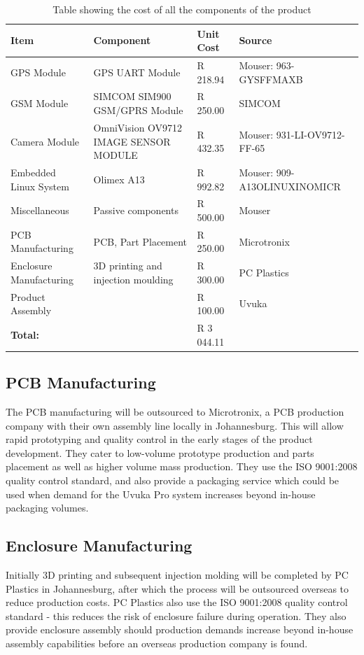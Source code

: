 \begin{table}[htbp]
  \centering
  \caption{Table showing the cost of all the components of the product}
    \begin{tabular}{k{0.2\textwidth}k{0.15\textwidth}R{0.15\textwidth}k{0.3\textwidth}}
    \toprule
    \textbf{Item} & \textbf{Component} & \textbf{Unit Cost} & \textbf{Source} \\
    \midrule
	GPS Module & GPS UART Module & R 218.94 & Mouser: 963-GYSFFMAXB \\ \midrule
    GSM Module & SIMCOM SIM900 GSM/GPRS Module & R 250.00 & SIMCOM \\ \midrule
    Camera Module & OmniVision OV9712 IMAGE SENSOR MODULE & R 432.35 & Mouser: 931-LI-OV9712-FF-65  \\ \midrule
    Embedded Linux System & Olimex A13 & R 992.82 & Mouser: 909-A13OLINUXINOMICR \\ \midrule
    Miscellaneous  & Passive components & R 500.00 & Mouser \\ \midrule
    PCB Manufacturing & PCB, Part Placement & R 250.00 & Microtronix \\ \midrule
    Enclosure Manufacturing & 3D printing and injection moulding & R 300.00 & PC Plastics \\ \midrule
    Product Assembly &       & R 100.00 & Uvuka \\ \midrule

    \textbf{Total:} &       & R 3 044.11 &  \\
    \bottomrule
    \end{tabular}%
  \label{tab:productCost}%
\end{table}%

\newpage
\subsection{PCB Manufacturing}
The PCB manufacturing will be outsourced to Microtronix, a PCB production company with their own assembly line locally in Johannesburg. This will allow rapid prototyping and quality control in the early stages of the product development. They cater to low-volume prototype production and parts placement as well as higher volume mass production. They use the ISO 9001:2008 quality control standard, and also provide a packaging service which could be used when demand for the Uvuka Pro system increases beyond in-house packaging volumes.

\subsection{Enclosure Manufacturing}
Initially 3D printing and subsequent injection molding will be completed by PC Plastics in Johannesburg, after which the process will be outsourced overseas to reduce production costs. PC Plastics also use the ISO 9001:2008 quality control standard - this reduces the risk of enclosure failure during operation. They also provide enclosure assembly should production demands increase beyond in-house assembly capabilities before an overseas production company is found. 


